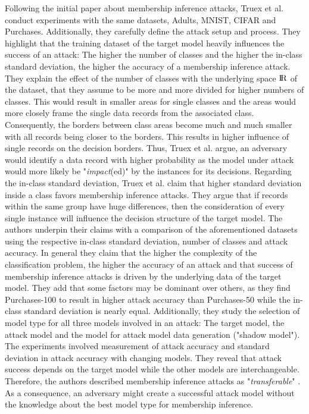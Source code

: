 \documentclass[runningheads]{llncs}
\begin{document}
Following the initial paper about membership inference attacks, Truex et al. \cite{truex2018towards} conduct experiments with the same datasets, Adults, MNIST, CIFAR and Purchases. Additionally, they carefully define the attack setup and process. They highlight that the training dataset of the target model heavily influences the success of an attack: The higher the number of classes and the higher the in-class standard deviation, the higher the accuracy of a membership inference attack. They explain the effect of the number of classes with the underlying space ${\rm I\!R}$ of the dataset, that they assume to be more and more divided for higher numbers of classes. This would result in smaller areas for single classes and the areas would more closely frame the single data records from the associated class. Consequently, the borders between class areas become much and much smaller with all records being closer to the borders. This results in higher influence of single records on the decision borders. Thus, Truex et al. argue, an adversary would identify a data record with higher probability as the model under attack would more likely be "\textit{impact}(ed)" by the instances for its decisions.
Regarding the in-class standard deviation, Truex et al. claim that higher standard deviation inside a class favors membership inference attacks. They argue that if records within the same group have huge differences, then the consideration of every single instance will influence the decision structure of the target model.
The authors underpin their claims with a comparison of the aforementioned datasets using the respective in-class standard deviation, number of classes and attack accuracy. In general they claim that the higher the complexity of the classification problem, the higher the accuracy of an attack and that success of membership inference attacks is driven by the underlying data of the target model. They add that some factors may be dominant over others, as they find Purchases-100 to result in higher attack accuracy than Purchases-50 while the in-class standard deviation is nearly equal.
Additionally, they study the selection of model type for all three models involved in an attack: The target model, the attack model and the model for attack model data generation ("shadow model"). The experiments involved measurement of attack accuracy and standard deviation in attack accuracy with changing models. They reveal that attack success depends on the target model while the other models are interchangeable. Therefore, the authors described membership inference attacks as "\textit{transferable}" \cite{truex2018towards}. As a consequence, an adversary might create a successful attack model without the knowledge about the best model type for membership inference.
\end{document}

